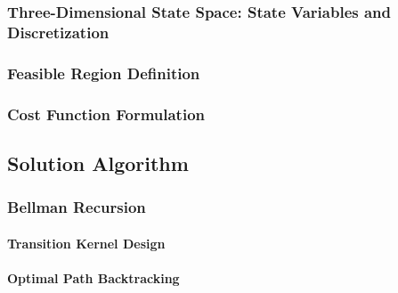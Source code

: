 \documentclass[12pt, a4paper]{report}
\begin{document}
\subsubsection{Three-Dimensional State Space: State Variables and Discretization}
\label{sssec:three_dimensional_state_space}


\subsubsection{Feasible Region Definition}
\label{sssec:feasible_region_definition}


\subsubsection{Cost Function Formulation}
\label{sssec:cost_function_formulation}


\subsection{Solution Algorithm}
\label{sec:solution_algorithm}

\subsubsection{Bellman Recursion}
\label{sssec:bellman_recursion}


\paragraph{Transition Kernel Design}
\label{par:transition_kernel_design}


\paragraph{Optimal Path Backtracking}
\label{par:optimal_path_backtracking}

\end{document}
